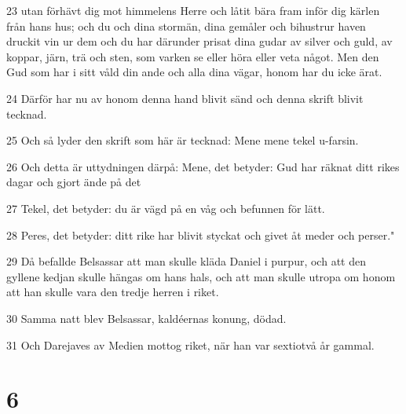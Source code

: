 \par 23 utan förhävt dig mot himmelens Herre och låtit bära fram inför dig kärlen från hans hus; och du och dina stormän, dina gemåler och bihustrur haven druckit vin ur dem och du har därunder prisat dina gudar av silver och guld, av koppar, järn, trä och sten, som varken se eller höra eller veta något. Men den Gud som har i sitt våld din ande och alla dina vägar, honom har du icke ärat.
\par 24 Därför har nu av honom denna hand blivit sänd och denna skrift blivit tecknad.
\par 25 Och så lyder den skrift som här är tecknad: Mene mene tekel u-farsin.
\par 26 Och detta är uttydningen därpå: Mene, det betyder: Gud har räknat ditt rikes dagar och gjort ände på det
\par 27 Tekel, det betyder: du är vägd på en våg och befunnen för lätt.
\par 28 Peres, det betyder: ditt rike har blivit styckat och givet åt meder och perser."
\par 29 Då befallde Belsassar att man skulle kläda Daniel i purpur, och att den gyllene kedjan skulle hängas om hans hals, och att man skulle utropa om honom att han skulle vara den tredje herren i riket.
\par 30 Samma natt blev Belsassar, kaldéernas konung, dödad.
\par 31 Och Darejaves av Medien mottog riket, när han var sextiotvå år gammal.

\chapter{6}

